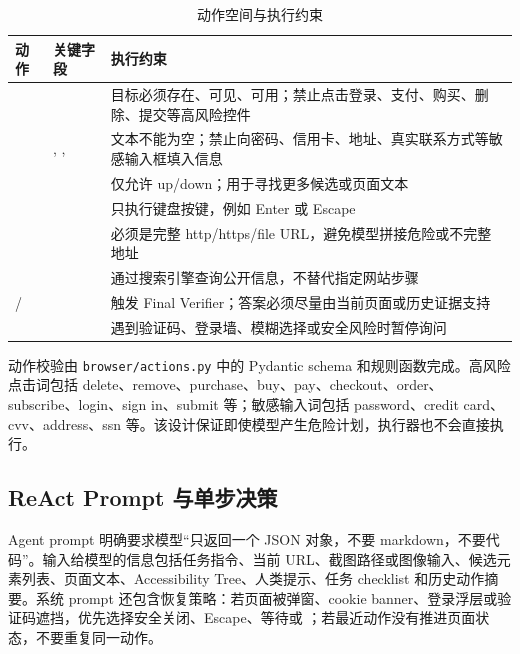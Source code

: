 \begin{table}[H]
  \centering
  \caption{动作空间与执行约束}
  \label{tab:action-space}
  \small
  \begin{tabularx}{\textwidth}{p{}p{}Y}
    \toprule
    动作 & 关键字段 & 执行约束 \\
    \midrule
     &  & 目标必须存在、可见、可用；禁止点击登录、支付、购买、删除、提交等高风险控件 \\
     & , ,  & 文本不能为空；禁止向密码、信用卡、地址、真实联系方式等敏感输入框填入信息 \\
     &  & 仅允许 up/down；用于寻找更多候选或页面文本 \\
     &  & 只执行键盘按键，例如 Enter 或 Escape \\
     &  & 必须是完整 http/https/file URL，避免模型拼接危险或不完整地址 \\
     &  & 通过搜索引擎查询公开信息，不替代指定网站步骤 \\
    / &  & 触发 Final Verifier；答案必须尽量由当前页面或历史证据支持 \\
     &  & 遇到验证码、登录墙、模糊选择或安全风险时暂停询问 \\
    \bottomrule
  \end{tabularx}
\end{table}

动作校验由 \texttt{browser/actions.py} 中的 Pydantic schema 和规则函数完成。高风险点击词包括 delete、remove、purchase、buy、pay、checkout、order、subscribe、login、sign in、submit 等；敏感输入词包括 password、credit card、cvv、address、ssn 等。该设计保证即使模型产生危险计划，执行器也不会直接执行。

\subsection{ReAct Prompt 与单步决策}

Agent prompt 明确要求模型“只返回一个 JSON 对象，不要 markdown，不要代码”。输入给模型的信息包括任务指令、当前 URL、截图路径或图像输入、候选元素列表、页面文本、Accessibility Tree、人类提示、任务 checklist 和历史动作摘要。系统 prompt 还包含恢复策略：若页面被弹窗、cookie banner、登录浮层或验证码遮挡，优先选择安全关闭、Escape、等待或 ；若最近动作没有推进页面状态，不要重复同一动作。

